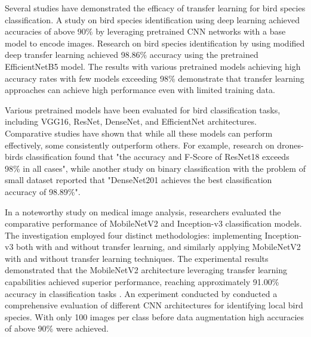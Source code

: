 \documentclass[a4paper,12pt]{report}
\begin{document}
Several studies have demonstrated the efficacy of transfer learning for bird species classification. A study on bird species identification using deep learning achieved accuracies of above 90\% by leveraging pretrained CNN networks with a base model to encode images\citep{Vo2023BirdDA}. Research on bird species identification by \citep{Mochurad2024ANE} using modified deep transfer learning achieved 98.86\% accuracy using the pretrained EfficientNetB5 model. The results with various pretrained models achieving high accuracy rates with few models exceeding 98\% demonstrate that transfer learning approaches can achieve high performance even with limited training data.

Various pretrained models have been evaluated for bird classification tasks, including VGG16, ResNet, DenseNet, and EfficientNet architectures. Comparative studies have shown that while all these models can perform effectively, some consistently outperform others. For example, research on drones-birds classification found that "the accuracy and F-Score of ResNet18 exceeds 98\% in all cases"\citep{Mohamed2023EfficientDC}, while another study on binary classification with the problem of small dataset reported that "DenseNet201 achieves the best classification accuracy of 98.89\%"\citep{Ren2023MonkeypoxDD}.

In a noteworthy study on medical image analysis, researchers evaluated the comparative performance of MobileNetV2 and Inception-v3 classification models. The investigation employed four distinct methodologies: implementing Inception-v3 both with and without transfer learning, and similarly applying MobileNetV2 with and without transfer learning techniques. The experimental results demonstrated that the MobileNetV2 architecture leveraging transfer learning capabilities achieved superior performance, reaching approximately 91.00\% accuracy in classification tasks \citep{Rahman2020}. An experiment conducted by \citep{9402686} conducted a comprehensive evaluation of different CNN architectures for identifying local bird species. With only 100 images per class before data augmentation high accuracies of above 90\% were achieved.

\end{document}
